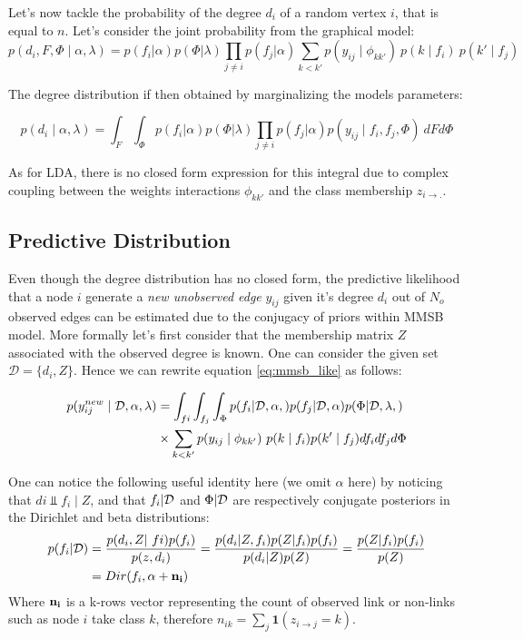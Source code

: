\documentclass[a4paper, 12pt]{article}
\begin{document}
Let's now tackle the probability of the degree $d_i$ of a random vertex $i$, that is equal to $n$. Let's consider the joint probability from the graphical model:
\begin{equation}
p(d_i, F, \Phi \mid \alpha, \lambda) = p(f_i| \alpha)p(\Phi|\lambda) \prod_{j\neq i} p(f_j|\alpha) \sum_{k<k'} p(y_{ij} \mid \phi_{kk'})\ p(k\mid f_i)\ p(k'\mid f_j)
\end{equation}

The degree distribution if then obtained by marginalizing the models parameters:

\begin{equation}
p(d_i \mid \alpha, \lambda) = \int_F \int_\Phi p(f_i| \alpha)p(\Phi|\lambda) \prod_{j\neq i} p(f_j|\alpha) p(y_{ij} \mid f_i, f_j, \Phi) \ dF d\Phi
\end{equation}

As for LDA, there is no closed form expression for this integral due to complex coupling between the weights interactions $\phi_{kk'}$ and the class membership $z_{i\rightarrow .}$. 

\subsection{Predictive Distribution}
Even though the degree distribution has no closed form, the predictive likelihood that a node $i$ generate a \emph{new unobserved edge} $y_{ij}$ given it's degree $d_i$ out of $N_o$ observed edges can be estimated due to the conjugacy of priors within MMSB model. More formally let's first consider that the membership matrix $Z$ associated with the observed degree is known. One can consider the given set $\mathcal{D} = \{d_i, Z\}$. Hence we can rewrite equation \eqref{eq:mmsb_like} as follows:

\begin{align} \label{eq:pred}
p(y_{ij}^{new} \mid \mathcal{D}, \alpha, \lambda) &= \int_{fi} \int_{f_j} \int_{\Phi} p(f_i|\mathcal{D}, \alpha, ) p(f_j|\mathcal{D}, \alpha)p(\Phi|\mathcal{D}, \lambda, ) \\
&\times \sum_{k<k'} p(y_{ij} \mid \phi_{kk'})\ p(k\mid f_i)p(k'\mid f_j)df_i df_j d\Phi
\end{align}

One can notice the following useful identity here (we omit $\alpha$ here) by noticing that $di \Perp f_i \mid Z$, and that  $f_i | \mathcal{D}$ and  $\Phi | \mathcal{D}$  are respectively  conjugate posteriors in the Dirichlet and beta distributions:
\begin{align}
p(f_i|\D) &= \frac{p(d_i, Z | fi) p(f_i)}{p(z, d_i)} = \frac{p(d_i|Z, f_i) p(Z|f_i) p(f_i)}{ p(d_i|Z)p(Z)} =  \frac{ p(Z|f_i) p(f_i)}{p(Z)} \\
&= Dir(f_i, \mat{\alpha} + \mat{n_i})
\end{align}
Where $\mathbf{n_i}$ is a k-rows vector representing the count of observed link or non-links such as node $i$ take class $k$, therefore $n_{ik} = \sum_j \bm{1}( z_{i\rightarrow j}=k)$.
\end{document}
